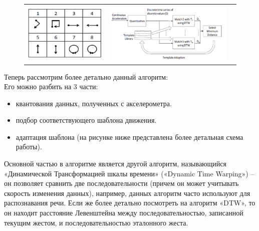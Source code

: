 \begin{figure}[H]
    \begin{center}
        \begin{tabular}{ccc}
            \includegraphics[scale = 0.9]{images/uWave_1.png} & 
            \includegraphics[scale = 0.9]{images/uWave_2.png} \\
        \end{tabular}
    \end{center}
\end{figure}

Теперь рассмотрим более детально данный алгоритм: \\
Его можно разбить на 3 части:
\begin{itemize}
    \item квантования данных, полученных с акселерометра.
    \item подбор соответствующего шаблона движения.
    \item адаптация шаблона (на рисунке ниже представлена более детальная схема работы).
\end{itemize}

Основной частью в алгоритме является другой алгоритм, называющийся «Динамической Трансформацией шкалы времени» («Dynamic Time Warping») -- он позволяет сравнить две последовательности (причем он может учитывать скорость изменения данных), например, данных алгоритм часто используют для распознавания речи. Если же более детально посмотреть на алгоритм «DTW», то он находит расстояние Левенштейна между последовательностью, записанной текущим жестом, и последовательностью эталонного жеста.

